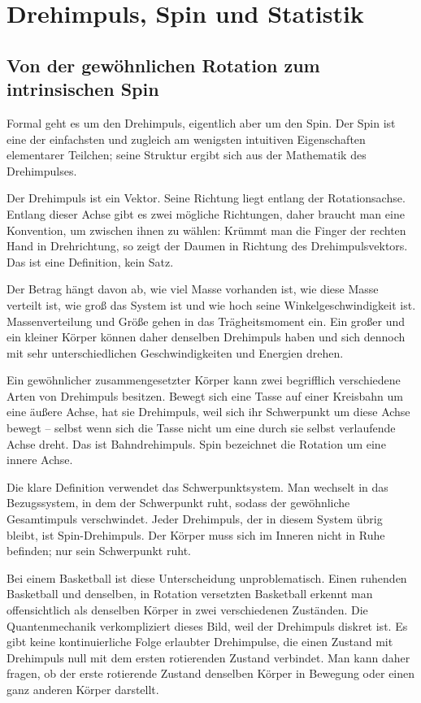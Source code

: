 \chapter{Drehimpuls, Spin und Statistik}

\section{Von der gewöhnlichen Rotation zum intrinsischen Spin}

Formal geht es um den Drehimpuls, eigentlich aber um den Spin. Der Spin ist eine der einfachsten und zugleich am wenigsten intuitiven Eigenschaften elementarer Teilchen; seine Struktur ergibt sich aus der Mathematik des Drehimpulses.

Der Drehimpuls ist ein Vektor. Seine Richtung liegt entlang der Rotationsachse. Entlang dieser Achse gibt es zwei mögliche Richtungen, daher braucht man eine Konvention, um zwischen ihnen zu wählen: Krümmt man die Finger der rechten Hand in Drehrichtung, so zeigt der Daumen in Richtung des Drehimpulsvektors. Das ist eine Definition, kein Satz.

Der Betrag hängt davon ab, wie viel Masse vorhanden ist, wie diese Masse verteilt ist, wie groß das System ist und wie hoch seine Winkelgeschwindigkeit ist. Massenverteilung und Größe gehen in das Trägheitsmoment ein. Ein großer und ein kleiner Körper können daher denselben Drehimpuls haben und sich dennoch mit sehr unterschiedlichen Geschwindigkeiten und Energien drehen.

Ein gewöhnlicher zusammengesetzter Körper kann zwei begrifflich verschiedene Arten von Drehimpuls besitzen. Bewegt sich eine Tasse auf einer Kreisbahn um eine äußere Achse, hat sie Drehimpuls, weil sich ihr Schwerpunkt um diese Achse bewegt – selbst wenn sich die Tasse nicht um eine durch sie selbst verlaufende Achse dreht. Das ist Bahndrehimpuls. Spin bezeichnet die Rotation um eine innere Achse.

Die klare Definition verwendet das Schwerpunktsystem. Man wechselt in das Bezugssystem, in dem der Schwerpunkt ruht, sodass der gewöhnliche Gesamtimpuls verschwindet. Jeder Drehimpuls, der in diesem System übrig bleibt, ist Spin-Drehimpuls. Der Körper muss sich im Inneren nicht in Ruhe befinden; nur sein Schwerpunkt ruht.

Bei einem Basketball ist diese Unterscheidung unproblematisch. Einen ruhenden Basketball und denselben, in Rotation versetzten Basketball erkennt man offensichtlich als denselben Körper in zwei verschiedenen Zuständen. Die Quantenmechanik verkompliziert dieses Bild, weil der Drehimpuls diskret ist. Es gibt keine kontinuierliche Folge erlaubter Drehimpulse, die einen Zustand mit Drehimpuls null mit dem ersten rotierenden Zustand verbindet. Man kann daher fragen, ob der erste rotierende Zustand denselben Körper in Bewegung oder einen ganz anderen Körper darstellt.

